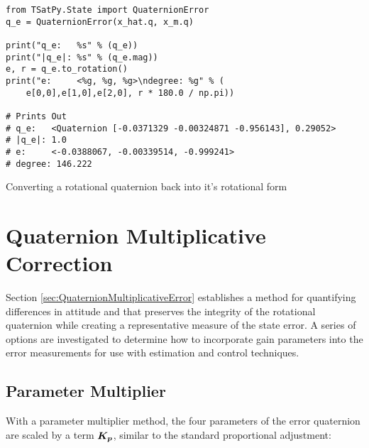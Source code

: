 \begin{listing}
\begin{singlespace}
  \begin{verbatim}
from TSatPy.State import QuaternionError
q_e = QuaternionError(x_hat.q, x_m.q)

print("q_e:   %s" % (q_e))
print("|q_e|: %s" % (q_e.mag))
e, r = q_e.to_rotation()
print("e:     <%g, %g, %g>\ndegree: %g" % (
    e[0,0],e[1,0],e[2,0], r * 180.0 / np.pi))

# Prints Out
# q_e:   <Quaternion [-0.0371329 -0.00324871 -0.956143], 0.29052>
# |q_e|: 1.0
# e:     <-0.0388067, -0.00339514, -0.999241>
# degree: 146.222
  \end{verbatim}
\caption{Converting a rotational quaternion back into it's rotational form}
\label{code:quat_to_rot}
\nocite{minted}
\end{singlespace}
\end{listing}

\section{Quaternion Multiplicative Correction}
\label{sec:QuaternionMultiplicativeCorrection}

Section \ref{sec:QuaternionMultiplicativeError} establishes a method for quantifying differences in attitude and that preserves the integrity of the rotational quaternion while creating a representative measure of the state error.  A series of options are investigated to determine how to incorporate gain parameters into the error measurements for use with estimation and control techniques.

\subsection{Parameter Multiplier}
\label{subsec:ParameterMultiplier}

With a parameter multiplier method, the four parameters of the error quaternion are scaled by a term $\boldsymbol{K_p}$, similar to the standard proportional adjustment:

